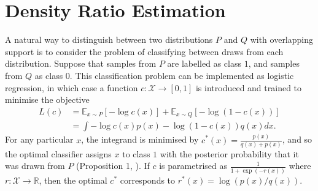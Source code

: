 



\section{Density Ratio Estimation}\label{sec:literature-density-ratio-estimation}

A natural way to distinguish between two distributions $P$ and $Q$ with overlapping support is to consider the problem of classifying between draws from each distribution.
Suppose that samples from $P$ are labelled as class $1$, and samples from $Q$ as class $0$. 
This classification problem can be implemented as logistic regression, in which case a function $c:\mathcal{X}\to [0,1]$ is introduced and trained to minimise the objective 
%
\begin{align*}
L(c) &=  \mathbb{E}_{x\sim P}\left[ - \log c(x) \right] + \mathbb{E}_{x \sim Q} \left[ - \log(1 - c(x)) \right] \\
&= \int -\log c(x) p(x) - \log (1 - c(x)) q(x) dx.
\end{align*}
%
For any particular $x$, the integrand is minimised by $c^*(x) = \frac{p(x)}{q(x) + p(x)}$, and so the optimal classifier assigns $x$ to class $1$ with the posterior probability that it was drawn from $P$ (Proposition 1, \cite{goodfellow2014generative}).
If $c$ is parametrised as $\frac{1}{1+\exp( -r(x))}$ where $r:\mathcal{X}\to\mathbb{R}$, then the optimal  $c^*$ corresponds to $r^*(x) = \log\left(p(x) / q(x)\right)$.


